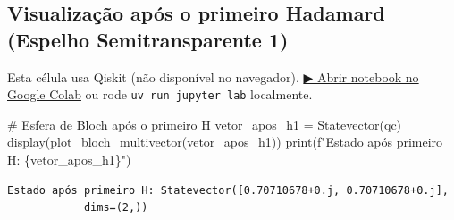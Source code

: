 \documentclass[
  brazilian,
]{report}
\newenvironment{Shaded}{\begin{snugshade}}{\end{snugshade}}
\newcommand{\BuiltInTok}[1]{\textcolor[rgb]{0.00,0.23,0.31}{#1}}
\newcommand{\CommentTok}[1]{\textcolor[rgb]{0.37,0.37,0.37}{#1}}
\newcommand{\NormalTok}[1]{\textcolor[rgb]{0.00,0.23,0.31}{#1}}
\newcommand{\OperatorTok}[1]{\textcolor[rgb]{0.37,0.37,0.37}{#1}}
\newcommand{\SpecialCharTok}[1]{\textcolor[rgb]{0.37,0.37,0.37}{#1}}
\newcommand{\SpecialStringTok}[1]{\textcolor[rgb]{0.13,0.47,0.30}{#1}}
\begin{document}
\subsection{Visualização após o primeiro Hadamard (Espelho
Semitransparente
1)}\label{visualizauxe7uxe3o-apuxf3s-o-primeiro-hadamard-espelho-semitransparente-1}

\begin{tcolorbox}[enhanced jigsaw, arc=.35mm, bottomrule=.15mm, bottomtitle=1mm, breakable, colback=white, colbacktitle=quarto-callout-warning-color!10!white, colframe=quarto-callout-warning-color-frame, coltitle=black, left=2mm, leftrule=.75mm, opacityback=0, opacitybacktitle=0.6, rightrule=.15mm, title=\textcolor{quarto-callout-warning-color}{\faExclamationTriangle}\hspace{0.5em}{⚛️ Célula Qiskit --- execute no Colab ou localmente}, titlerule=0mm, toprule=.15mm, toptitle=1mm]

Esta célula usa Qiskit (não disponível no navegador).
\href{https://colab.research.google.com/github/maxwellamaral/aula-quantum/blob/main/notebooks/04-Hadamard-experiment.ipynb}{▶
Abrir notebook no Google Colab} ou rode \texttt{uv\ run\ jupyter\ lab}
localmente.

\begin{Shaded}
\begin{Highlighting}[]

\CommentTok{\# Esfera de Bloch após o primeiro H}
\NormalTok{vetor\_apos\_h1 }\OperatorTok{=}\NormalTok{ Statevector(qc)}
\NormalTok{display(plot\_bloch\_multivector(vetor\_apos\_h1))}
\BuiltInTok{print}\NormalTok{(}\SpecialStringTok{f"Estado após primeiro H: }\SpecialCharTok{\{}\NormalTok{vetor\_apos\_h1}\SpecialCharTok{\}}\SpecialStringTok{"}\NormalTok{)}
\end{Highlighting}
\end{Shaded}

\end{tcolorbox}

\begin{verbatim}
Estado após primeiro H: Statevector([0.70710678+0.j, 0.70710678+0.j],
            dims=(2,))
\end{verbatim}
\end{document}
